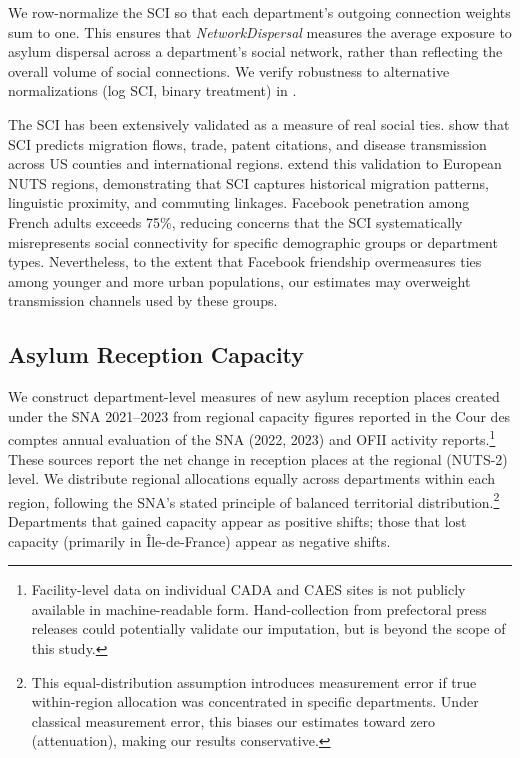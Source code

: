 \documentclass[12pt]{article}
\begin{document}
We row-normalize the SCI so that each department's outgoing connection weights sum to one. This ensures that \textit{NetworkDispersal} measures the average exposure to asylum dispersal across a department's social network, rather than reflecting the overall volume of social connections. We verify robustness to alternative normalizations (log SCI, binary treatment) in .

The SCI has been extensively validated as a measure of real social ties. \citet{bailey2018social} show that SCI predicts migration flows, trade, patent citations, and disease transmission across US counties and international regions. \citet{bailey2020social} extend this validation to European NUTS regions, demonstrating that SCI captures historical migration patterns, linguistic proximity, and commuting linkages. Facebook penetration among French adults exceeds 75\%, reducing concerns that the SCI systematically misrepresents social connectivity for specific demographic groups or department types. Nevertheless, to the extent that Facebook friendship overmeasures ties among younger and more urban populations, our estimates may overweight transmission channels used by these groups.

\subsection{Asylum Reception Capacity}

We construct department-level measures of new asylum reception places created under the SNA 2021--2023 from regional capacity figures reported in the Cour des comptes annual evaluation of the SNA (2022, 2023) and OFII activity reports.\footnote{Facility-level data on individual CADA and CAES sites is not publicly available in machine-readable form. Hand-collection from prefectoral press releases could potentially validate our imputation, but is beyond the scope of this study.} These sources report the net change in reception places at the regional (NUTS-2) level. We distribute regional allocations equally across departments within each region, following the SNA's stated principle of balanced territorial distribution.\footnote{This equal-distribution assumption introduces measurement error if true within-region allocation was concentrated in specific departments. Under classical measurement error, this biases our estimates toward zero (attenuation), making our results conservative.} Departments that gained capacity appear as positive shifts; those that lost capacity (primarily in \^Ile-de-France) appear as negative shifts.
\end{document}
